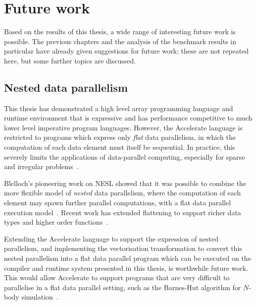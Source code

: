%
%


\section{Future work}

Based on the results of this thesis, a wide range of interesting future work is
possible. The previous chapters and the analysis of the benchmark results in
particular have already given suggestions for future work; these are not
repeated here, but some further topics are discussed.

\subsection{Nested data parallelism}

This thesis has demonstrated a high level array programming language and runtime
environment that is expressive and has performance competitive to much lower
level imperative program languages. However, the Accelerate language is
restricted to programs which express only \emph{flat} data parallelism, in which
the computation of each data element must itself be sequential. In practice,
this severely limits the applications of data-parallel computing, especially for
sparse and irregular problems~\cite{Prins:1999}.

Blelloch's pioneering work on NESL showed that it was possible to combine the
more flexible model of \emph{nested} data parallelism, where the computation of
each element may spawn further parallel computations, with a flat data parallel
execution model~\cite{Blelloch:1988iu}. Recent work has extended flattening to
support richer data types and higher order functions~\cite{Jones:2008uu}.

Extending the Accelerate language to support the expression of nested
parallelism, and implementing the vectorisation transformation to convert this
nested parallelism into a flat data parallel program which can be executed on
the compiler and runtime system presented in this thesis, is worthwhile future
work. This would allow Accelerate to support programs that are very difficult to
parallelise in a flat data parallel setting, such as the Barnes-Hut algorithm
for $N$-body simulation~\cite{Barnes:1986}.


